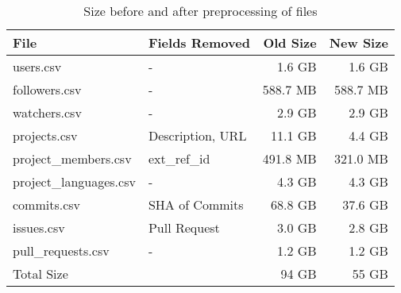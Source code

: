 \vspace{25px}
\begin{table}[htb]
    \centering

    \begin{tabular}{@{}llrr@{}}
    \toprule
        File & Fields Removed & Old Size & New Size \\
    \midrule
        users.csv              & -                &   1.6 GB &    1.6 GB \\
        followers.csv          & -                & 588.7 MB &  588.7 MB \\
        watchers.csv           & -                &   2.9 GB &    2.9 GB \\
        projects.csv           & Description, URL &  11.1 GB &    4.4 GB \\
        project\_members.csv   & ext\_ref\_id     & 491.8 MB &  321.0 MB \\
        project\_languages.csv & -                &   4.3 GB &    4.3 GB \\
        commits.csv            & SHA of Commits   &  68.8 GB &   37.6 GB \\
        issues.csv             & Pull Request     &   3.0 GB &    2.8 GB \\
        pull_requests.csv      & -                &   1.2 GB &    1.2 GB \\
    \midrule
        Total Size             &                  &    94 GB &     55 GB \\
    \bottomrule
    \end{tabular}

    \caption{Size before and after preprocessing of files}
\end{table}

